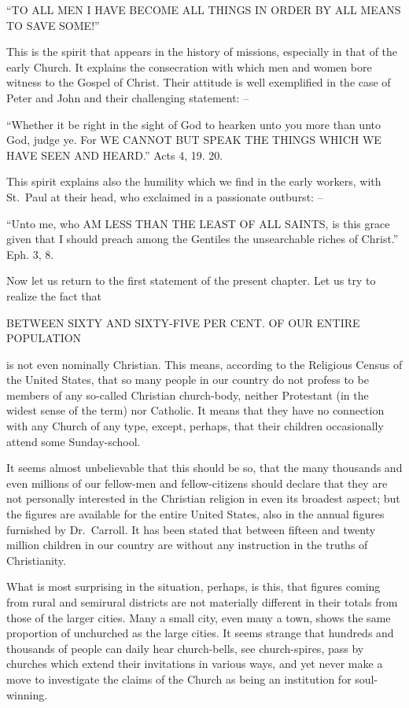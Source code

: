 \documentclass[
]{book}
\begin{document}
``TO ALL MEN I HAVE BECOME ALL THINGS IN ORDER BY ALL MEANS TO SAVE SOME!''

This is the spirit that appears in the history of missions, especially in that of the early Church. It explains the consecration with which men and women bore witness to the Gospel of Christ. Their attitude is well exemplified in the case of Peter and John and their challenging statement: --

``Whether it be right in the sight of God to hearken unto you more than unto God, judge ye. For WE CANNOT BUT SPEAK THE THINGS WHICH WE HAVE SEEN AND HEARD.'' Acts 4, 19. 20.

This spirit explains also the humility which we find in the early workers, with St.~Paul at their head, who exclaimed in a passionate outburst: --

``Unto me, who AM LESS THAN THE LEAST OF ALL SAINTS, is this grace given that I should preach among the Gentiles the unsearchable riches of Christ.'' Eph. 3, 8.

Now let us return to the first statement of the present chapter. Let us try to realize the fact that

\begin{center} BETWEEN SIXTY AND SIXTY-FIVE PER CENT. OF OUR ENTIRE POPULATION \end{center}

is not even nominally Christian. This means, according to the Religious Census of the United States, that so many people in our country do not profess to be members of any so-called Christian church-body, neither Protestant (in the widest sense of the term) nor Catholic. It means that they have no connection with any Church of any type, except, perhaps, that their children occasionally attend some Sunday-school.

It seems almost unbelievable that this should be so, that the many thousands and even millions of our fellow-men and fellow-citizens should declare that they are not personally interested in the Christian religion in even its broadest aspect; but the figures are available for the entire United States, also in the annual figures furnished by Dr.~Carroll. It has been stated that between fifteen and twenty million children in our country are without any instruction in the truths of Christianity.

What is most surprising in the situation, perhaps, is this, that figures coming from rural and semirural districts are not materially different in their totals from those of the larger cities. Many a small city, even many a town, shows the same proportion of unchurched as the large cities. It seems strange that hundreds and thousands of people can daily hear church-bells, see church-spires, pass by churches which extend their invitations in various ways, and yet never make a move to investigate the claims of the Church as being an institution for soul-winning.
\end{document}
